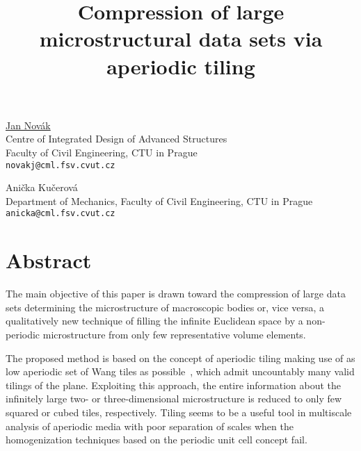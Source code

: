 \title{Compression of large microstructural data sets via aperiodic tiling}
\author{} \institute{}
\maketitle

\begin{center}
{\large \underline{Jan Nov\'{a}k}}\\
Centre of Integrated Design of Advanced Structures\\
Faculty of Civil Engineering, CTU in Prague\\
{\tt novakj@cml.fsv.cvut.cz}\\
\vspace{4mm}

{\large Ani\v{c}ka Ku\v{c}erov\'{a}}\\
Department of Mechanics, Faculty of Civil Engineering, CTU in Prague\\
{\tt anicka@cml.fsv.cvut.cz}
\end{center}

\section*{Abstract}
The main objective of this paper is drawn toward the compression of large data sets determining the microstructure of macroscopic bodies or, vice versa, a qualitatively new technique of filling the infinite Euclidean space by a non-periodic microstructure from only few representative volume elements.

The proposed method is based on the concept of aperiodic tiling making use of as low aperiodic set of Wang tiles as possible~\cite{Cohen:2003:WTI:1201775.882265,Culik96}, which admit uncountably many valid tilings of the plane. Exploiting this approach, the entire information about the infinitely large two- or three-dimensional microstructure is reduced to only few squared or cubed tiles, respectively. Tiling seems to be a useful tool in multiscale analysis of aperiodic media with poor separation of scales when the homogenization techniques based on the periodic unit cell concept fail.

